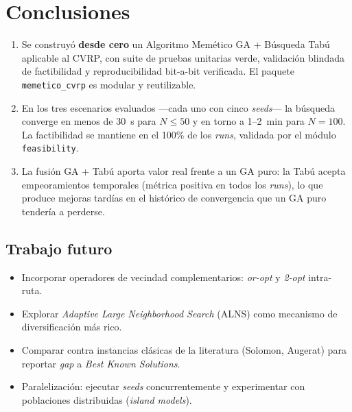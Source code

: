 \section{Conclusiones}
\label{sec:conclusiones}

\begin{enumerate}
    \item Se construyó \textbf{desde cero} un Algoritmo Memético GA + Búsqueda Tabú aplicable al CVRP, con suite de pruebas unitarias verde, validación blindada de factibilidad y reproducibilidad bit-a-bit verificada. El paquete \texttt{memetico\_cvrp} es modular y reutilizable.

    \item En los tres escenarios evaluados —cada uno con cinco \emph{seeds}— la búsqueda converge en menos de 30~s para $N \le 50$ y en torno a 1--2~min para $N = 100$. La factibilidad se mantiene en el 100\% de los \emph{runs}, validada por el módulo \texttt{feasibility}.

    \item La fusión GA + Tabú aporta valor real frente a un GA puro: la Tabú acepta empeoramientos temporales (métrica  positiva en todos los \emph{runs}), lo que produce mejoras tardías en el histórico de convergencia que un GA puro tendería a perderse.
\end{enumerate}

\subsection*{Trabajo futuro}

\begin{itemize}
    \item Incorporar operadores de vecindad complementarios: \emph{or-opt} y \emph{2-opt} intra-ruta.
    \item Explorar \emph{Adaptive Large Neighborhood Search} (ALNS) como mecanismo de diversificación más rico.
    \item Comparar contra instancias clásicas de la literatura (Solomon, Augerat) para reportar \emph{gap} a \emph{Best Known Solutions}.
    \item Paralelización: ejecutar \emph{seeds} concurrentemente y experimentar con poblaciones distribuidas (\emph{island models}).
\end{itemize}
